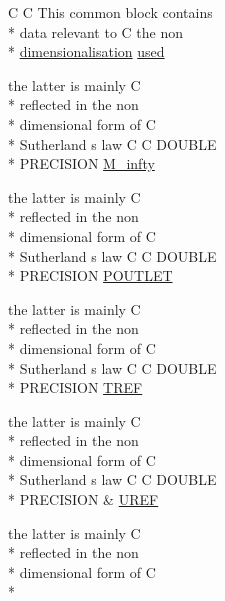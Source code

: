 \begin{DoxyCompactItemize}
\item 
C C This common block contains \\*
data relevant to C the non \\*
\hyperlink{ioplasma_8com_a400563a4c7d85c3c04db2d7e198c44a3}{dimensionalisation} \hyperlink{home_2abonfi_2_c_f_d__codes_2_eul_f_s_83_84_2include_2stream_8com_a3291a21585d0aec360cd82d75bf51496}{used}
\item 
the latter is mainly C \\*
reflected in the non \\*
dimensional form of C \\*
Sutherland s law C C D\-O\-U\-B\-L\-E \\*
P\-R\-E\-C\-I\-S\-I\-O\-N \hyperlink{home_2abonfi_2_c_f_d__codes_2_eul_f_s_83_84_2include_2stream_8com_a57c765efd76d44669f6966962bda2d72}{M\-\_\-infty}
\item 
the latter is mainly C \\*
reflected in the non \\*
dimensional form of C \\*
Sutherland s law C C D\-O\-U\-B\-L\-E \\*
P\-R\-E\-C\-I\-S\-I\-O\-N \hyperlink{home_2abonfi_2_c_f_d__codes_2_eul_f_s_83_84_2include_2stream_8com_a42c20c83e2242ab14c0d4178f49679c8}{P\-O\-U\-T\-L\-E\-T}
\item 
the latter is mainly C \\*
reflected in the non \\*
dimensional form of C \\*
Sutherland s law C C D\-O\-U\-B\-L\-E \\*
P\-R\-E\-C\-I\-S\-I\-O\-N \hyperlink{home_2abonfi_2_c_f_d__codes_2_eul_f_s_83_84_2include_2stream_8com_a8c4a60ca1b033fbd4e2cadaf15146ca5}{T\-R\-E\-F}
\item 
the latter is mainly C \\*
reflected in the non \\*
dimensional form of C \\*
Sutherland s law C C D\-O\-U\-B\-L\-E \\*
P\-R\-E\-C\-I\-S\-I\-O\-N \& \hyperlink{home_2abonfi_2_c_f_d__codes_2_eul_f_s_83_84_2include_2stream_8com_ab0954e3210109eba37b309fef6a66996}{U\-R\-E\-F}
\item 
the latter is mainly C \\*
reflected in the non \\*
dimensional form of C \\*

\end{DoxyCompactItemize}
